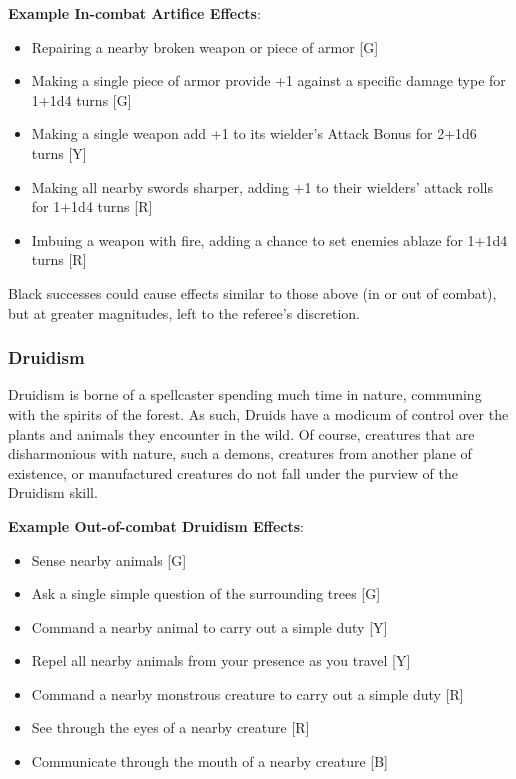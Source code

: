 \documentclass[oneside]{book}
\begin{document}
\begin{multicols}{2}
\textbf{Example In-combat Artifice Effects}: 
	\begin{itemize}
		\setlength{\itemsep}{0cm}%
  		\setlength{\parskip}{0cm}%
  		\item{ \small Repairing a nearby broken weapon or piece of armor [G]}
  		\item{ \small Making a single piece of armor provide +1 against a specific damage type for 1+1d4 turns [G]}
  		\item{ \small Making a single weapon add +1 to its wielder's Attack Bonus for 2+1d6 turns [Y]}
  		\item{ \small Making all nearby swords sharper, adding +1 to their wielders' attack rolls for 1+1d4 turns [R]}
  		\item{ \small Imbuing a weapon with fire, adding a chance to set enemies ablaze for 1+1d4 turns [R]}
	\end{itemize}
Black successes could cause effects similar to those above (in or out of combat), but at greater magnitudes, left to the referee's discretion.

\subsubsection{Druidism}
Druidism is borne of a spellcaster spending much time in nature, communing with the spirits of the forest. As such, Druids have a modicum of control over the plants and animals they encounter in the wild. Of course, creatures that are disharmonious with nature, such a demons, creatures from another plane of existence, or manufactured creatures do not fall under the purview of the Druidism skill.

\textbf{Example Out-of-combat Druidism Effects}: 
	\begin{itemize}
		\setlength{\itemsep}{0cm}%
  		\setlength{\parskip}{0cm}%
		\item{ \small Sense nearby animals [G]}
		\item{ \small Ask a single simple question of the surrounding trees [G]}
		\item{ \small Command a nearby animal to carry out a simple duty [Y]}
		\item{ \small Repel all nearby animals from your presence as you travel [Y]}
		\item{ \small Command a nearby monstrous creature to carry out a simple duty [R]}
		\item{ \small See through the eyes of a nearby creature [R]}
		\item{ \small Communicate through the mouth of a nearby creature [B]}
	\end{itemize}
	

\end{multicols}
\end{document}
